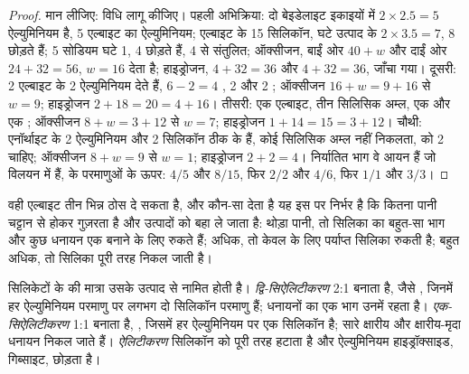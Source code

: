 \begin{proof}
मान लीजिए: विधि लागू कीजिए। पहली अभिक्रिया: दो बेइडेलाइट इकाइयों में $2\times2.5 = 5$ ऐल्युमिनियम है, 5 एल्बाइट का ऐल्युमिनियम; एल्बाइट के 15 सिलिकॉन, घटे उत्पाद के $2\times3.5 = 7$, 8  छोड़ते हैं; 5 सोडियम घटे 1, 4  छोड़ते हैं, 4  से संतुलित; ऑक्सीजन, बाईं ओर $40 + w$ और दाईं ओर $24 + 32 =
56$, $w = 16$ देता है; हाइड्रोजन, $4 + 32 = 36$ और $4 + 32 = 36$, जाँचा गया। दूसरी: 2 एल्बाइट  के 2 ऐल्युमिनियम देते हैं, $6 - 2 = 4$ , 2  और 2 ; ऑक्सीजन $16 + w = 9 + 16$ से $w = 9$; हाइड्रोजन $2 + 18 = 20 = 4 + 16$। तीसरी: एक एल्बाइट, तीन सिलिसिक अम्ल, एक  और एक ; ऑक्सीजन $8 + w = 3 + 12$ से $w = 7$; हाइड्रोजन $1 + 14 = 15 = 3 + 12$। चौथी: एनॉर्थाइट के 2 ऐल्युमिनियम और 2 सिलिकॉन ठीक  के हैं, कोई सिलिसिक अम्ल नहीं निकलता,  को 2  चाहिए; ऑक्सीजन $8 + w = 9$ से $w = 1$; हाइड्रोजन $2 + 2 = 4$। निर्यातित भाग वे आयन हैं जो विलयन में हैं,  के परमाणुओं के ऊपर: $4/5$ और $8/15$, फिर $2/2$ और $4/6$, फिर $1/1$ और $3/3$।
\end{proof}

वही एल्बाइट तीन भिन्न ठोस दे सकता है, और कौन-सा देता है यह इस पर निर्भर है कि कितना पानी चट्टान से होकर गुज़रता है और उत्पादों को बहा ले जाता है: थोड़ा पानी, तो सिलिका का बहुत-सा भाग और कुछ धनायन एक  बनाने के लिए रुकते हैं; अधिक, तो केवल  के लिए पर्याप्त सिलिका रुकती है; बहुत अधिक, तो सिलिका पूरी तरह निकल जाती है।

\begin{definition}\label{def:b1:weathering-clays:hydrolysis-degree}
सिलिकेटों के  की मात्रा उसके उत्पाद से नामित होती है। \emph{द्वि-सिऐलिटीकरण} 2:1  बनाता है, जैसे , जिनमें हर ऐल्युमिनियम परमाणु पर लगभग दो सिलिकॉन परमाणु हैं; धनायनों का एक भाग उनमें रहता है। \emph{एक-सिऐलिटीकरण} 1:1  बनाता है, , जिसमें हर ऐल्युमिनियम पर एक सिलिकॉन है; सारे क्षारीय और क्षारीय-मृदा धनायन निकल जाते हैं। \emph{ऐलिटीकरण} सिलिकॉन को पूरी तरह हटाता है और ऐल्युमिनियम हाइड्रॉक्साइड, गिब्साइट, छोड़ता है।
\end{definition}


